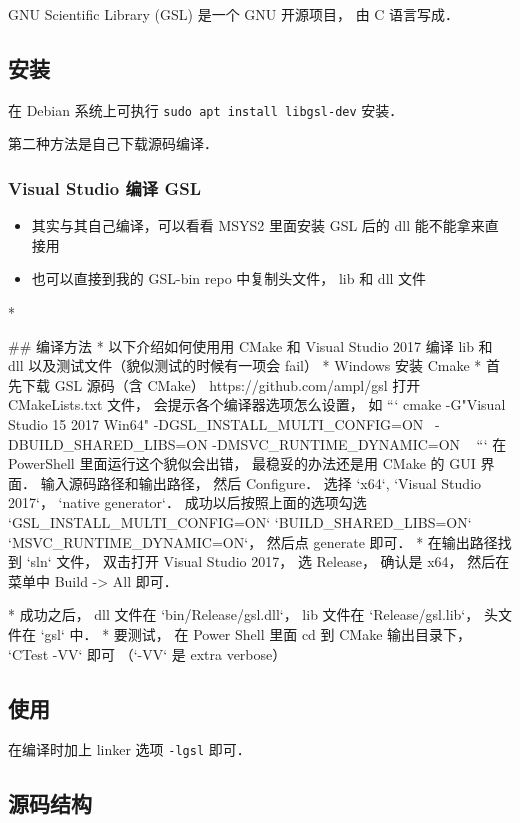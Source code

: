 
\begin{issues}
\issueDraft
\issueMissDepend
\end{issues}

GNU Scientific Library (GSL) 是一个 GNU 开源项目， 由 C 语言写成．

\subsection{安装}
在 Debian 系统上可执行 \verb|sudo apt install libgsl-dev| 安装．

第二种方法是自己下载源码编译．

\subsubsection{Visual Studio 编译 GSL}
\begin{itemize}
\item 其实与其自己编译，可以看看 MSYS2 里面安装 GSL 后的 dll 能不能拿来直接用
\item 也可以直接到我的 GSL-bin repo 中复制头文件， lib 和 dll 文件
\end{itemize}

* 

## 编译方法
* 以下介绍如何使用用 CMake 和 Visual Studio 2017 编译 lib 和 dll 以及测试文件（貌似测试的时候有一项会 fail）
* Windows 安装 Cmake
* 首先下载 GSL 源码（含 CMake）
https://github.com/ampl/gsl
打开 CMakeLists.txt 文件， 会提示各个编译器选项怎么设置， 如
```
    cmake -G"Visual Studio 15 2017 Win64" -DGSL_INSTALL_MULTI_CONFIG=ON \
          -DBUILD_SHARED_LIBS=ON -DMSVC_RUNTIME_DYNAMIC=ON \
          <path to gsl sources>
```
在 PowerShell 里面运行这个貌似会出错， 最稳妥的办法还是用 CMake 的 GUI 界面． 输入源码路径和输出路径， 然后 Configure． 选择 `x64`, `Visual Studio 2017`， `native generator`． 成功以后按照上面的选项勾选 `GSL_INSTALL_MULTI_CONFIG=ON` `BUILD_SHARED_LIBS=ON` `MSVC_RUNTIME_DYNAMIC=ON`， 然后点 generate 即可．
* 在输出路径找到 `sln` 文件， 双击打开 Visual Studio 2017， 选 Release， 确认是 x64， 然后在菜单中 Build -> All 即可．

* 成功之后， dll 文件在 `bin/Release/gsl.dll`， lib 文件在 `Release/gsl.lib`， 头文件在 `gsl` 中．
* 要测试， 在 Power Shell 里面 cd 到 CMake 输出目录下， `CTest -VV` 即可 （`-VV` 是 extra verbose）



\subsection{使用}
在编译时加上 linker 选项 \verb|-lgsl| 即可．

\subsection{源码结构}

